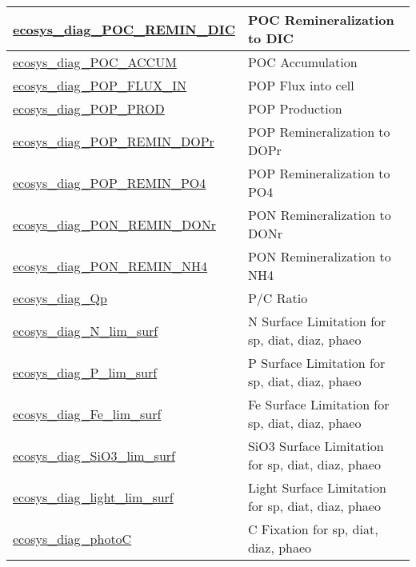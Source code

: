 {\begin{center}
\begin{longtable}{| p{2.0in} | p{4.0in} |}
    \hline
    \hyperref[subsec:var_sec_forcing_ecosys_diag_POC_REMIN_DIC]{ecosys\_diag\_POC\_REMIN\_\-DIC} & POC Remineralization to DIC \\
    \hline
    \hyperref[subsec:var_sec_forcing_ecosys_diag_POC_ACCUM]{ecosys\_diag\_POC\_ACCUM} & POC Accumulation \\
    \hline
    \hyperref[subsec:var_sec_forcing_ecosys_diag_POP_FLUX_IN]{ecosys\_diag\_POP\_FLUX\_IN} & POP Flux into cell \\
    \hline
    \hyperref[subsec:var_sec_forcing_ecosys_diag_POP_PROD]{ecosys\_diag\_POP\_PROD} & POP Production \\
    \hline
    \hyperref[subsec:var_sec_forcing_ecosys_diag_POP_REMIN_DOPr]{ecosys\_diag\_POP\_REMIN\_\-DOPr} & POP Remineralization to DOPr \\
    \hline
    \hyperref[subsec:var_sec_forcing_ecosys_diag_POP_REMIN_PO4]{ecosys\_diag\_POP\_REMIN\_\-PO4} & POP Remineralization to PO4 \\
    \hline
    \hyperref[subsec:var_sec_forcing_ecosys_diag_PON_REMIN_DONr]{ecosys\_diag\_PON\_REMIN\_\-DONr} & PON Remineralization to DONr \\
    \hline
    \hyperref[subsec:var_sec_forcing_ecosys_diag_PON_REMIN_NH4]{ecosys\_diag\_PON\_REMIN\_\-NH4} & PON Remineralization to NH4 \\
    \hline
    \hyperref[subsec:var_sec_forcing_ecosys_diag_Qp]{ecosys\_diag\_Qp} & P/C Ratio \\
    \hline
    \hyperref[subsec:var_sec_forcing_ecosys_diag_N_lim_surf]{ecosys\_diag\_N\_lim\_surf} & N Surface Limitation for sp, diat, diaz, phaeo \\
    \hline
    \hyperref[subsec:var_sec_forcing_ecosys_diag_P_lim_surf]{ecosys\_diag\_P\_lim\_surf} & P Surface Limitation for sp, diat, diaz, phaeo \\
    \hline
    \hyperref[subsec:var_sec_forcing_ecosys_diag_Fe_lim_surf]{ecosys\_diag\_Fe\_lim\_surf} & Fe Surface Limitation for sp, diat, diaz, phaeo \\
    \hline
    \hyperref[subsec:var_sec_forcing_ecosys_diag_SiO3_lim_surf]{ecosys\_diag\_SiO3\_lim\_surf} & SiO3 Surface Limitation for sp, diat, diaz, phaeo \\
    \hline
    \hyperref[subsec:var_sec_forcing_ecosys_diag_light_lim_surf]{ecosys\_diag\_light\_lim\_surf} & Light Surface Limitation for sp, diat, diaz, phaeo \\
    \hline
    \hyperref[subsec:var_sec_forcing_ecosys_diag_photoC]{ecosys\_diag\_photoC} & C Fixation for sp, diat, diaz, phaeo \\

\end{longtable}
\end{center}}
